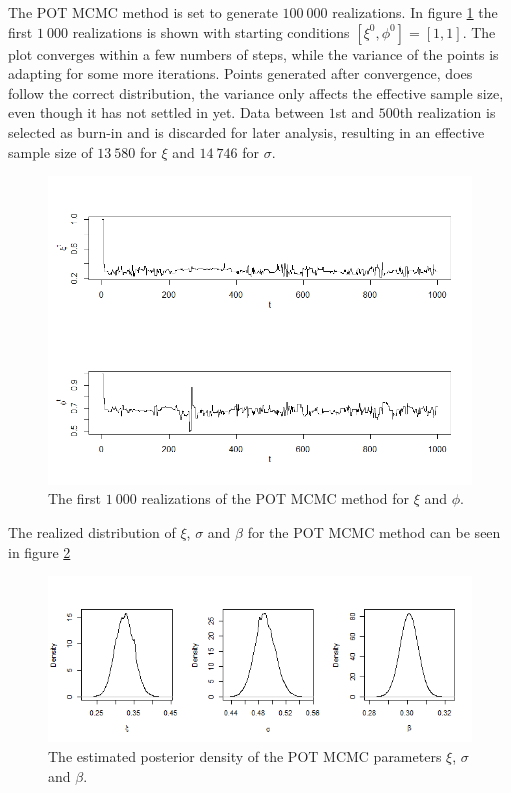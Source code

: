 The POT MCMC method is set to generate $100 \ 000$ realizations. In figure \ref{fig:paretoconvergence} the first $1 \ 000$ realizations is shown with starting conditions $[\xi^0,\phi^0]=[1,1]$. The plot converges within a few numbers of steps, while the variance of the points is adapting for some more iterations. Points generated after convergence, does follow the correct distribution, the variance only affects the effective sample size, even though it has not settled in yet. Data between $1$st and $500$th realization is selected as burn-in and is discarded for later analysis, resulting in an effective sample size of $13 \ 580$ for $\xi$ and $14 \ 746$ for $\sigma$. %
\begin{figure}
  \centering
    \includegraphics[width=1\textwidth]{fig/result/paretoconvergence.png}
  \caption{The first $1 \ 000$ realizations of the POT MCMC method for $\xi$ and $\phi$.}
  \label{fig:paretoconvergence}
\end{figure}
The realized distribution of $\xi$, $\sigma$ and $\beta$ for the POT MCMC method can be seen in figure \ref{fig:paretoxisigmabeta}
\begin{figure}
  \centering
    \includegraphics[width=1\textwidth]{fig/result/paretoxisigmabeta.png}
  \caption{The estimated posterior density of the POT MCMC parameters $\xi$, $\sigma$ and $\beta$.}
  \label{fig:paretoxisigmabeta}
\end{figure}

